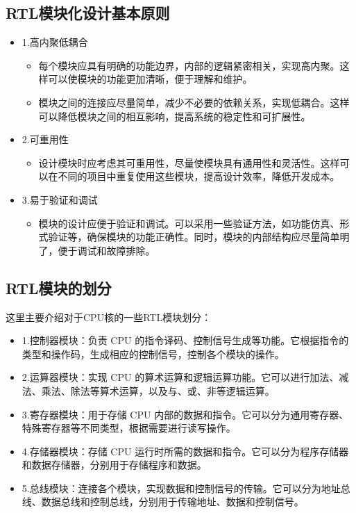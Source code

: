 \subsection{RTL模块化设计基本原则}\label{sec:16-chip-frontend-012}

\begin{itemize}
\item
  1.高内聚低耦合

  \begin{itemize}
  \tightlist
  \item
    每个模块应具有明确的功能边界，内部的逻辑紧密相关，实现高内聚。这样可以使模块的功能更加清晰，便于理解和维护。
  \item
    模块之间的连接应尽量简单，减少不必要的依赖关系，实现低耦合。这样可以降低模块之间的相互影响，提高系统的稳定性和可扩展性。
  \end{itemize}
\item
  2.可重用性

  \begin{itemize}
  \tightlist
  \item
    设计模块时应考虑其可重用性，尽量使模块具有通用性和灵活性。这样可以在不同的项目中重复使用这些模块，提高设计效率，降低开发成本。
  \end{itemize}
\item
  3.易于验证和调试

  \begin{itemize}
  \tightlist
  \item
    模块的设计应便于验证和调试。可以采用一些验证方法，如功能仿真、形式验证等，确保模块的功能正确性。同时，模块的内部结构应尽量简单明了，便于调试和故障排除。
  \end{itemize}
\end{itemize}

\subsection{RTL模块的划分}\label{sec:16-chip-frontend-013}

这里主要介绍对于CPU核的一些RTL模块划分：

\begin{itemize}
\item
  1.控制器模块：负责 CPU
  的指令译码、控制信号生成等功能。它根据指令的类型和操作码，生成相应的控制信号，控制各个模块的操作。
\item
  2.运算器模块：实现 CPU
  的算术运算和逻辑运算功能。它可以进行加法、减法、乘法、除法等算术运算，以及与、或、非等逻辑运算。
\item
  3.寄存器模块：用于存储 CPU
  内部的数据和指令。它可以分为通用寄存器、特殊寄存器等不同类型，根据需要进行读写操作。
\item
  4.存储器模块：存储 CPU
  运行时所需的数据和指令。它可以分为程序存储器和数据存储器，分别用于存储程序和数据。
\item
  5.总线模块：连接各个模块，实现数据和控制信号的传输。它可以分为地址总线、数据总线和控制总线，分别用于传输地址、数据和控制信号。
\end{itemize}

